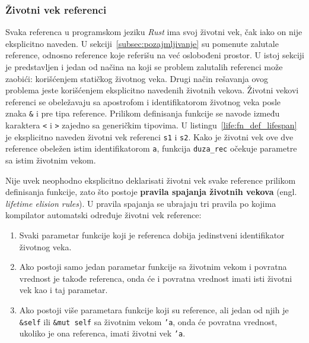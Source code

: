 \documentclass[12pt,oneside]{memoir}
\begin{document}
\subsubsection{Životni vek referenci}
Svaka referenca u programskom jeziku \emph{Rust} ima svoj životni vek, čak iako on nije
eksplicitno naveden. U sekciji~\ref{subsec:pozajmljivanje} su pomenute zalutale reference,
odnosno reference koje referišu na već oslobođeni prostor. U istoj sekciji je predstavljen
i jedan od načina na koji se problem zalutalih referenci može zaobići:
korišćenjem statičkog životnog veka. Drugi način rešavanja ovog problema jeste korišćenjem
eksplicitno navedenih životnih vekova.
Životni vekovi referenci se obeležavaju sa apostrofom i identifikatorom životnog veka posle
znaka \texttt{\&} i pre tipa reference. Prilikom definisanja funkcije se navode između
karaktera \texttt{<} i \texttt{>} zajedno sa generičkim tipovima.
U listingu~\ref{life:fn_def_lifespan} je eksplicitno naveden životni vek referenci
\texttt{s1} i \texttt{s2}. Kako je životni vek ove dve reference obeležen istim
identifikatorom \texttt{a}, funkcija \texttt{duza\_rec} očekuje parametre sa istim životnim vekom.



Nije uvek neophodno eksplicitno deklarisati životni vek svake reference prilikom
definisanja funkcije, zato što
postoje \textbf{pravila spajanja životnih vekova} (engl. \emph{lifetime elision rules}).
U pravila spajanja se ubrajaju tri
pravila po kojima kompilator automatski određuje životni vek reference:

\begin{enumerate}
  \item Svaki parametar funkcije koji je referenca dobija jedinstveni identifikator
        životnog veka.
  \item Ako postoji samo jedan parametar funkcije sa životnim vekom i povratna vrednost je
        takođe referenca, onda
        će i povratna vrednost imati isti životni vek kao i taj parametar.
  \item Ako postoji više parametara funkcije koji su reference, ali jedan od
        njih je \texttt{\&self} ili \texttt{\&mut self} sa životnim vekom \texttt{'a},
        onda će povratna vrednost, ukoliko je ona referenca, imati životni vek
        \texttt{'a}.
\end{enumerate}
\end{document}

